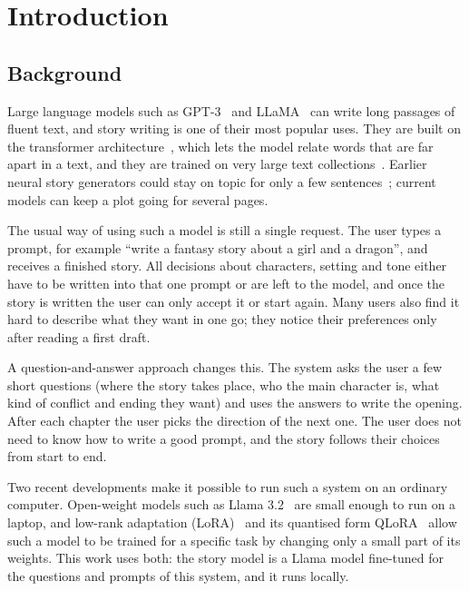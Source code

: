 \chapter{Introduction}
\label{ch:intro}

\section{Background}
\label{sec:intro-background}

Large language models such as GPT-3~\cite{brown2020gpt3} and LLaMA~\cite{touvron2023llama} can write long passages of fluent text, and story writing is one of their most popular uses. They are built on the transformer architecture~\cite{vaswani2017attention}, which lets the model relate words that are far apart in a text, and they are trained on very large text collections~\cite{zhao2023llmsurvey}. Earlier neural story generators could stay on topic for only a few sentences~\cite{fan2018hierarchical}; current models can keep a plot going for several pages.

The usual way of using such a model is still a single request. The user types a prompt, for example ``write a fantasy story about a girl and a dragon'', and receives a finished story. All decisions about characters, setting and tone either have to be written into that one prompt or are left to the model, and once the story is written the user can only accept it or start again. Many users also find it hard to describe what they want in one go; they notice their preferences only after reading a first draft.

A question-and-answer approach changes this. The system asks the user a few short questions (where the story takes place, who the main character is, what kind of conflict and ending they want) and uses the answers to write the opening. After each chapter the user picks the direction of the next one. The user does not need to know how to write a good prompt, and the story follows their choices from start to end.

Two recent developments make it possible to run such a system on an ordinary computer. Open-weight models such as Llama 3.2~\cite{meta2024llama32} are small enough to run on a laptop, and low-rank adaptation (LoRA)~\cite{hu2022lora} and its quantised form QLoRA~\cite{dettmers2023qlora} allow such a model to be trained for a specific task by changing only a small part of its weights. This work uses both: the story model is a Llama model fine-tuned for the questions and prompts of this system, and it runs locally.

